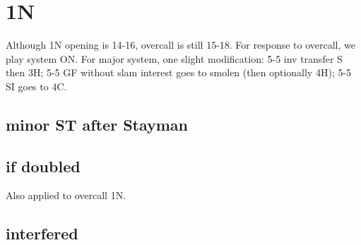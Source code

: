\section{1N}

Although 1N opening is 14-16, overcall is still 15-18. For response to overcall, we play system ON.
For major system, one slight modification: 5-5 inv transfer S then 3H; 5-5 GF without slam interest goes to smolen (then optionally 4H); 5-5 SI goes to 4C.


\subsection{minor ST after Stayman}


\subsection{if doubled}

Also applied to overcall 1N.


\subsection{interfered}

